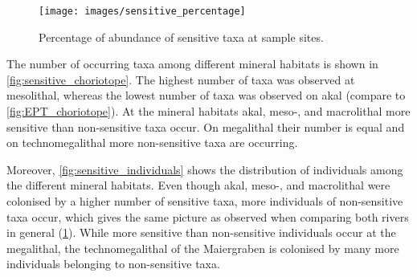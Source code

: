 \begin{figure}[!htb]                            %
  \center
  \texttt{[image: images/sensitive\_percentage]}                 %
  \caption{Percentage of abundance of sensitive taxa at sample sites.}                      %
  \label{fig:sensitive_percentage}                                                        %
\end{figure}


The number of occurring taxa among different mineral habitats is shown in \cref{fig:sensitive_choriotope}. The highest number of taxa was observed at mesolithal, whereas the lowest number of taxa was observed on akal (compare to \cref{fig:EPT_choriotope}). At the mineral habitats akal, meso-, and macrolithal more sensitive than non-sensitive taxa occur. On megalithal their number is equal and on technomegalithal more non-sensitive taxa are occurring.



Moreover, \cref{fig:sensitive_individuals} shows the distribution of individuals among the different mineral habitats. Even though akal, meso-, and macrolithal were colonised by a higher number of sensitive taxa, more individuals of non-sensitive taxa occur, which gives the same picture as observed when comparing both rivers in general (\cref{fig:sensitive_percentage}). While more sensitive than non-sensitive individuals occur at the megalithal, the technomegalithal of the Maiergraben is colonised by many more individuals belonging to non-sensitive taxa.





